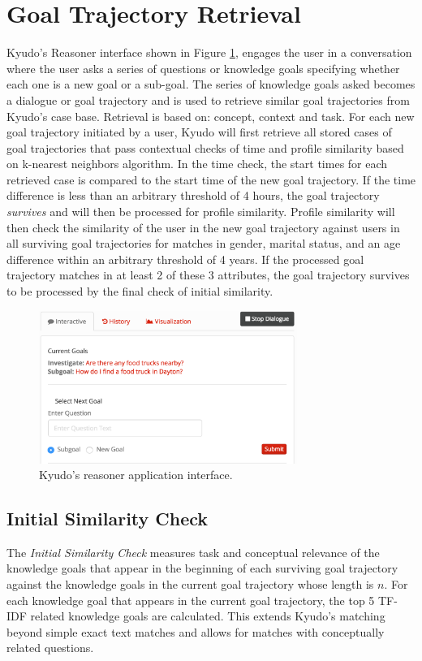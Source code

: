 \documentclass{llncs}
\begin{document}
\section{Goal Trajectory Retrieval}
	Kyudo's Reasoner interface shown in Figure \ref{fig:kyudo_interface}, engages the user in a conversation where the user asks a series of questions or knowledge goals specifying whether each one is a new goal or a sub-goal. The series of knowledge goals asked becomes a dialogue or goal trajectory and is used to retrieve similar goal trajectories from Kyudo's case base.
	Retrieval is based on: concept, context and task. For each new goal trajectory initiated by a user, Kyudo will first retrieve all stored cases of goal trajectories that pass contextual checks of time and profile similarity based on k-nearest neighbors algorithm. In the time check, the start times for each retrieved case is compared to the start time of the new goal trajectory. If the time difference is less than an arbitrary threshold of 4 hours, the goal trajectory \textit{survives} and will then be processed for profile similarity. Profile similarity will then check the similarity of the user in the new goal trajectory against users in all surviving goal trajectories for matches in gender, marital status, and an age difference within an arbitrary threshold of 4 years. If the processed goal trajectory matches in at least 2 of these 3 attributes, the goal trajectory survives to be processed by the final check of initial similarity.
    
\begin{figure}[!t]
	\centering
    \includegraphics[width=0.75\textwidth]
    {figures/interface.png}
    \caption{Kyudo's reasoner application interface.}
    \label{fig:kyudo_interface}
\end{figure}

\subsection{Initial Similarity Check}
The \textit{Initial Similarity Check} measures task and conceptual relevance of the knowledge goals that appear in the beginning of each surviving goal trajectory against the knowledge goals in the current goal trajectory whose length is $n$. For each knowledge goal that appears in the current goal trajectory, the top 5 TF-IDF related knowledge goals are calculated. This extends Kyudo's matching beyond simple exact text matches and allows for matches with conceptually related questions. 
	
\end{document}
